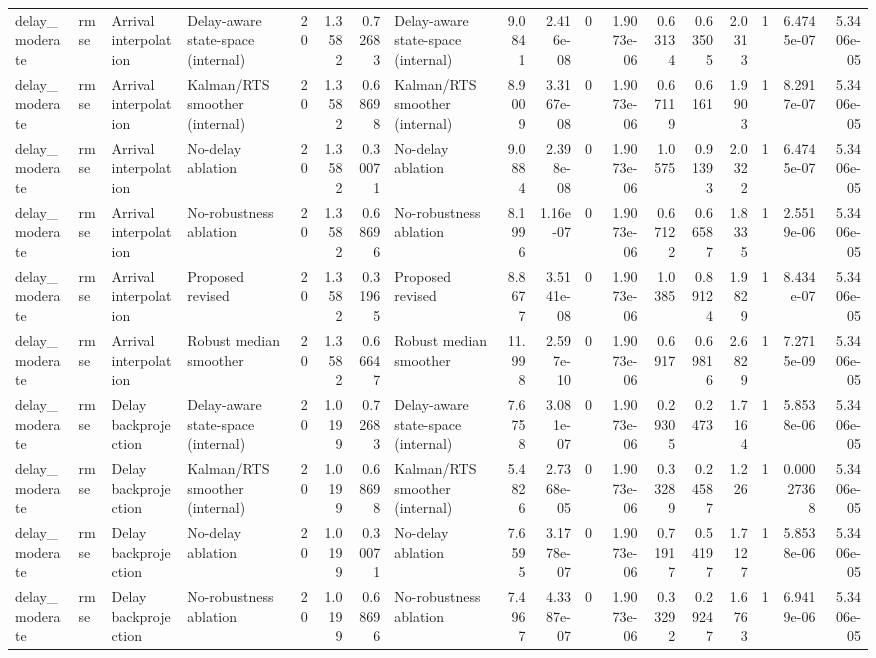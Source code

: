 \begin{table}[!htbp]
{\begin{tabular}{llllrrrlrrrrrrrrrr}
delay_moderate & rmse & Arrival interpolation & Delay-aware state-space (internal) & 20 & 1.3582 & 0.72683 & Delay-aware state-space (internal) & 9.0841 & 2.416e-08 & 0 & 1.9073e-06 & 0.63134 & 0.63505 & 2.0313 & 1 & 6.4745e-07 & 5.3406e-05 \\
delay_moderate & rmse & Arrival interpolation & Kalman/RTS smoother (internal) & 20 & 1.3582 & 0.68698 & Kalman/RTS smoother (internal) & 8.9009 & 3.3167e-08 & 0 & 1.9073e-06 & 0.67119 & 0.6161 & 1.9903 & 1 & 8.2917e-07 & 5.3406e-05 \\
delay_moderate & rmse & Arrival interpolation & No-delay ablation & 20 & 1.3582 & 0.30071 & No-delay ablation & 9.0884 & 2.398e-08 & 0 & 1.9073e-06 & 1.0575 & 0.91393 & 2.0322 & 1 & 6.4745e-07 & 5.3406e-05 \\
delay_moderate & rmse & Arrival interpolation & No-robustness ablation & 20 & 1.3582 & 0.68696 & No-robustness ablation & 8.1996 & 1.16e-07 & 0 & 1.9073e-06 & 0.67122 & 0.66587 & 1.8335 & 1 & 2.5519e-06 & 5.3406e-05 \\
delay_moderate & rmse & Arrival interpolation & Proposed revised & 20 & 1.3582 & 0.31965 & Proposed revised & 8.8677 & 3.5141e-08 & 0 & 1.9073e-06 & 1.0385 & 0.89124 & 1.9829 & 1 & 8.434e-07 & 5.3406e-05 \\
delay_moderate & rmse & Arrival interpolation & Robust median smoother & 20 & 1.3582 & 0.66647 & Robust median smoother & 11.998 & 2.597e-10 & 0 & 1.9073e-06 & 0.6917 & 0.69816 & 2.6829 & 1 & 7.2715e-09 & 5.3406e-05 \\
delay_moderate & rmse & Delay backprojection & Delay-aware state-space (internal) & 20 & 1.0199 & 0.72683 & Delay-aware state-space (internal) & 7.6758 & 3.081e-07 & 0 & 1.9073e-06 & 0.29305 & 0.2473 & 1.7164 & 1 & 5.8538e-06 & 5.3406e-05 \\
delay_moderate & rmse & Delay backprojection & Kalman/RTS smoother (internal) & 20 & 1.0199 & 0.68698 & Kalman/RTS smoother (internal) & 5.4826 & 2.7368e-05 & 0 & 1.9073e-06 & 0.33289 & 0.24587 & 1.226 & 1 & 0.00027368 & 5.3406e-05 \\
delay_moderate & rmse & Delay backprojection & No-delay ablation & 20 & 1.0199 & 0.30071 & No-delay ablation & 7.6595 & 3.1778e-07 & 0 & 1.9073e-06 & 0.71917 & 0.54197 & 1.7127 & 1 & 5.8538e-06 & 5.3406e-05 \\
delay_moderate & rmse & Delay backprojection & No-robustness ablation & 20 & 1.0199 & 0.68696 & No-robustness ablation & 7.4967 & 4.3387e-07 & 0 & 1.9073e-06 & 0.33292 & 0.29247 & 1.6763 & 1 & 6.9419e-06 & 5.3406e-05 \\

\end{tabular}}
\end{table}
